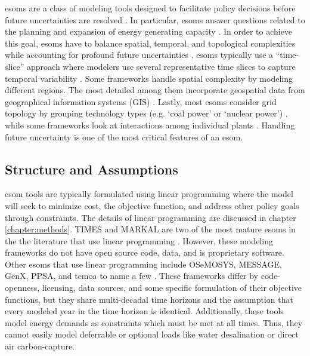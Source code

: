 \glspl{esom} are a class of modeling tools designed to facilitate policy decisions before
future uncertainties are resolved \cite{hunter_modeling_2013}. In particular, \glspl{esom} answer questions
related to the planning and expansion of energy generating capacity \cite{de_queiroz_repurposing_2019}.
In order to achieve this goal, \glspl{esom} have to balance spatial, temporal, and topological
complexities while accounting for profound future uncertainties \cite{martinez-gordon_review_2021}.
\glspl{esom} typically use a “time-slice” approach where modelers use several
representative time slices to capture temporal variability \cite{fattahi_systemic_2020}.
Some frameworks handle spatial complexity by modeling different regions. The most
detailed among them incorporate geospatial data from geographical information
systems (GIS) \cite{fattahi_systemic_2020}.
Lastly, most \glspl{esom} consider grid topology by grouping technology types
(e.g. ‘coal power’ or ‘nuclear power’) \cite{fattahi_systemic_2020}, while some
frameworks look at interactions among individual plants \cite{jenkins_enhanced_2017}.
Handling future uncertainty is one of the most critical features of an \gls{esom}.

\subsection{Structure and Assumptions}

\gls{esom} tools are typically formulated using linear programming where the model
will seek to minimize cost, the objective function, and address other policy
goals through constraints. The details of linear programming are discussed in
chapter \ref{chapter:methods}. TIMES and MARKAL are two of the most mature
\glspl{esom} in the the literature that use linear programming \cite{decarolis_case_2012}.
However, these modeling frameworks do not have open source code, data, and is
proprietary software. Other \glspl{esom} that use linear programming include
OSeMOSYS, MESSAGE, GenX, PPSA, and \gls{temoa} to name a few
\cite{decarolis_case_2012,yue_review_2018,jenkins_enhanced_2017}. These
frameworks differ by code-openness, licensing, data sources, and some specific
formulation of their objective functions, but they share multi-decadal
time horizons and the assumption that every modeled year in the time
horizon is identical. Additionally, these tools model energy demands as constraints
which must be met at all times. Thus, they cannot easily model deferrable or optional
loads like water desalination or direct air carbon-capture.

